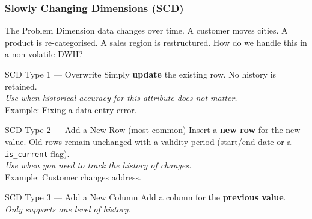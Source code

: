 \begin{frame}
  \frametitle{Slowly Changing Dimensions (SCD)}

  \begin{block}{The Problem}
    Dimension data changes over time. A customer moves cities.
    A product is re-categorised. A sales region is restructured.
    How do we handle this in a non-volatile DWH?
  \end{block}

  \begin{block}{SCD Type 1 --- Overwrite}
    Simply \textbf{update} the existing row. No history is retained.\\
    \textit{Use when historical accuracy for this attribute does not matter.}\\
    Example: Fixing a data entry error.
  \end{block}

  \begin{block}{SCD Type 2 --- Add a New Row (most common)}
    Insert a \textbf{new row} for the new value. Old rows remain unchanged
    with a validity period (start/end date or a \texttt{is\_current} flag).\\
    \textit{Use when you need to track the history of changes.}\\
    Example: Customer changes address.
  \end{block}

  \begin{block}{SCD Type 3 --- Add a New Column}
    Add a column for the \textbf{previous value}.\\
    \textit{Only supports one level of history.}
  \end{block}
\end{frame}


